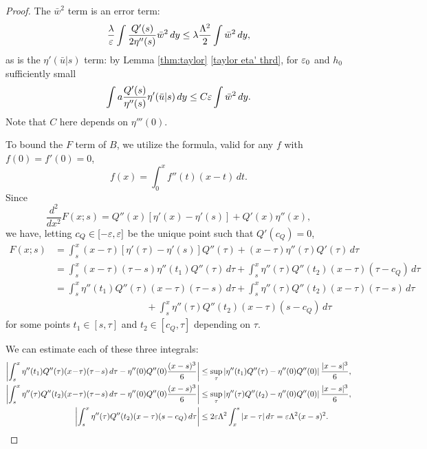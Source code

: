 \begin{proof}
The $\bar{w}^2$ term is an error term: 
\begin{equation} \label{w(ubar) bound}
\frac{\lambda}{\varepsilon} \int \frac{Q'(s)}{2 \eta''(s)} \bar{w}^2 \,dy \leq \lambda \frac{\Lambda^2}{2} \int \bar{w}^2 \,dy, 
\end{equation}
as is the $\eta'(\bar{u}|s)$ term:  by Lemma \ref{thm:taylor} \ref{taylor eta' thrd}, for $\varepsilon_0$ and $h_0$ sufficiently small
\begin{equation} \label{eta'(ubar) bound} 
\int a \frac{Q'(s)}{\eta''(s)} \eta'(\bar{u}|s) \,dy \leq C \varepsilon \int \bar{w}^2 \,dy.
\end{equation}
Note that $C$ here depends on $\eta'''(0)$. 

To bound the $F$ term of $B$, we utilize the formula, valid for any $f$ with $f(0)=f'(0)=0$, 
\[ f(x) = \int_0^x f''(t) (x-t) \,dt. \]
Since
\[ \frac{d^2}{dx^2} F(x;s) = Q''(x) [\eta'(x)-\eta'(s)] + Q'(x) \eta''(x), \]
we have, letting $c_Q \in [-\varepsilon,\varepsilon]$ be the unique point such that $Q'(c_Q) = 0$,
\begin{equation} \label{F decomposition} \begin{aligned} 
F(x;s) &= \int_s^x (x-\tau) [\eta'(\tau)-\eta'(s)]Q''(\tau) + (x-\tau) \eta''(\tau)Q'(\tau)\,d\tau
\\ &= \int_s^x (x-\tau) (\tau-s) \eta''(t_1) Q''(\tau) \,d\tau + \int_s^x \eta''(\tau) Q''(t_2) (x-\tau)(\tau-c_Q) \,d\tau
\\ &= \int_s^x \eta''(t_1) Q''(\tau) (x-\tau) (\tau-s) \,d\tau + \int_s^x \eta''(\tau) Q''(t_2) (x-\tau) (\tau-s) \,d\tau 
\\ & \hspace{4cm} + \int_s^x \eta''(\tau) Q''(t_2) (x-\tau) (s-c_Q) \,d\tau
\end{aligned} \end{equation}
for some points $t_1 \in [s,\tau]$ and $t_2 \in [c_Q,\tau]$ depending on $\tau$.  

We can estimate each of these three integrals:
\begin{equation} \label{bound the three parts} \begin{aligned}
\abs{\int_s^x \eta''(t_1) Q''(\tau) (x\!-\!\tau) (\tau\!-\!s) \,d\tau - \eta''(0)Q''(0) \frac{(x-s)^3}{6}} &\leq \sup_\tau \abs{\eta''(t_1)Q''(\tau) - \eta''(0)Q''(0)} \frac{|x-s|^3}{6}, \\
\abs{\int_s^x \eta''(\tau) Q''(t_2) (x\!-\!\tau) (\tau\!-\!s) \,d\tau - \eta''(0)Q''(0) \frac{(x-s)^3}{6}} &\leq 
\sup_\tau \abs{\eta''(\tau)Q''(t_2) - \eta''(0)Q''(0)} \frac{|x-s|^3}{6}, \\
\abs{\int_s^x \eta''(\tau) Q''(t_2) (x-\tau) (s-c_Q) \,d\tau} &\leq 2 \eps \Lambda^2 \int_x^s |x-\tau| \,d\tau = \eps \Lambda^2 (x-s)^2.
\end{aligned}\end{equation}


\end{proof}
